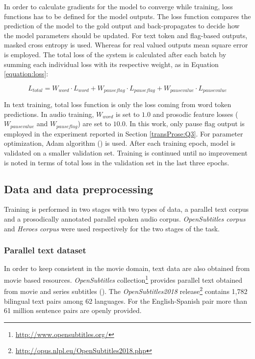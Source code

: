In order to calculate gradients for the model to converge while training, loss functions has to be defined for the model outputs. The loss function compares the prediction of the model to the gold output and back-propagates to decide how the model parameters should be updated. For text token and flag-based outputs, masked cross entropy is used. Whereas for real valued outputs mean square error is employed. The total loss of the system is calculated after each batch by summing each individual loss with its respective weight, as in Equation \ref{equation:loss}:

\begin{equation}
    \label{equation:loss}
    { L }_{ total }= { W }_{ word }\cdot { L }_{ word }+ { W }_{ pauseflag }\cdot { L }_{ pauseflag } + { W }_{ pausevalue }\cdot { L }_{ pausevalue }
\end{equation}

In text training, total loss function is only the loss coming from word token predictions. In audio training, ${ W }_{ word }$ is set to $1.0$ and prosodic feature losses (${ W }_{ pausevalue }$ and ${ W }_{ pauseflag }$) are set to $10.0$. In this work, only pause flag output is employed in the experiment reported in Section \ref{transProse:Q3}. For parameter optimization, Adam algorithm (\cite{DBLP:journals/corr/KingmaB14}) is used. After each training epoch, model is validated on a smaller validation set. Training is continued until no improvement is noted in terms of total loss in the validation set in the last three epochs. 

\subsection{Data and data preprocessing}
\label{transProse:methodology:data}

Training is performed in two stages with two types of data, a parallel text corpus and a prosodically annotated parallel spoken audio corpus. \textit{OpenSubtitles corpus} and \textit{Heroes corpus} were used respectively for the two stages of the task. 

\subsubsection{Parallel text dataset}
In order to keep consistent in the movie domain, text data are also obtained from movie based resources. \textit{OpenSubtitles} collection\footnote{\url{http://www.opensubtitles.org/}} provides parallel text obtained from movie and series subtitles (\cite{Lison2016OpenSubtitles2016EL}). The \textit{OpenSubtitles2018} release\footnote{\url{http://opus.nlpl.eu/OpenSubtitles2018.php}} contains 1,782 bilingual text pairs among 62 languages. For the English-Spanish pair more than 61 million sentence pairs are openly provided. 

